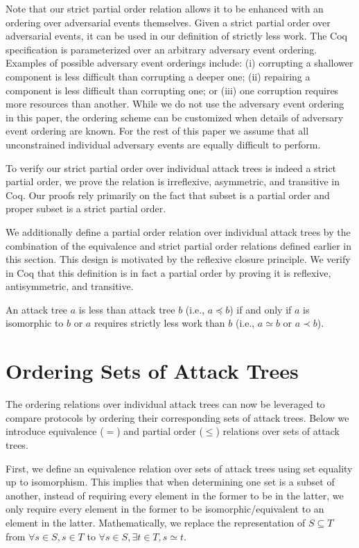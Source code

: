 \documentclass[runningheads]{llncs}
\theoremstyle{definition}
\begin{document}
Note that our strict partial order relation allows it to be enhanced
with an ordering over adversarial events themselves. Given a strict
partial order over adversarial events, it can be used in our
definition of strictly less work.  The Coq specification is
parameterized over an arbitrary adversary event ordering. Examples of
possible adversary event orderings include: (i) corrupting a shallower
component is less difficult than corrupting a deeper one; (ii)
repairing a component is less difficult than corrupting one; or (iii)
one corruption requires more resources than another.  While we do not
use the adversary event ordering in this paper, the ordering scheme
can be customized when details of adversary event ordering are
known. For the rest of this paper we assume that all unconstrained
individual adversary events are equally difficult to perform.

To verify our strict partial order over individual attack trees is
indeed a strict partial order, we prove the relation is irreflexive,
asymmetric, and transitive in Coq. Our proofs rely primarily on the
fact that subset is a partial order and proper subset is a strict
partial order.

We additionally define a partial order relation over individual attack
trees by the combination of the equivalence and strict partial order
relations defined earlier in this section. This design is motivated by
the reflexive closure principle. We verify in Coq that this definition
is in fact a partial order by proving it is reflexive, antisymmetric,
and transitive.

\begin{definition}
  An attack tree $a$ is less than attack tree $b$ (i.e., $a \preceq
  b$) if and only if $a$ is isomorphic to $b$ or $a$ requires strictly
  less work than $b$ (i.e., $a \simeq b$ or $a \prec b$). 
\end{definition}


\section{Ordering Sets of Attack Trees}

The ordering relations over individual attack trees can now be
leveraged to compare protocols by ordering their corresponding sets of
attack trees. Below we introduce equivalence ($=$) and partial order
($\le$) relations over sets of attack trees.

First, we define an equivalence relation over sets of attack trees
using set equality up to isomorphism. This implies that when
determining one set is a subset of another, instead of requiring every
element in the former to be in the latter, we only require every
element in the former to be isomorphic/equivalent to an element in the
latter. Mathematically, we replace the representation of
$S \subseteq T$ from $\forall s \in S, s \in T$ to
$\forall s \in S, \exists t \in T, s \simeq t$.
\end{document}
